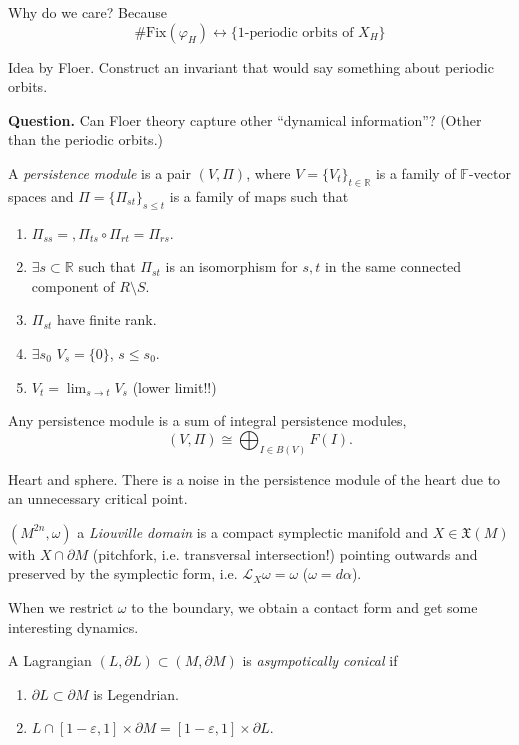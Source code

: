{Why do we care? Because
$$
\# \text{Fix}(\varphi_H)\leftrightarrow\{\text{1-periodic 
orbits of $X_H$}\}
$$

Idea by Floer. Construct an invariant that would 
say something about periodic orbits.

\medskip\noindent
{\bf Question.} Can Floer theory capture other ``dynamical information''? 
(Other than the periodic orbits.)

\medskip\noindent
A {\it persistence module} is a pair $(V,\Pi)$, where $V=\{V_t\}_{t \in
\mathbb{R}}$ is a family of $\mathbb{F}$-vector spaces
and $\Pi=\{\Pi_{st}\}_{s \leq  t}$ is a family of maps such that
\begin{enumerate}
\item $\Pi_{ss}=, \Pi_{ts}\circ \Pi_{rt}=\Pi_{rs}$.
\item $\exists  s \subset \mathbb{R}$ such that
$\Pi_{s t}$ is an isomorphism for $s,t$ in the same connected component of
$R\setminus S$.
\item $\Pi_{s t}$ have finite rank.
\item $\exists s_0$ $V_s=\{0\}$, $s \leq s_0$.
\item $V_t= \lim_{s \to t} V_s$ (lower limit!!)
\end{enumerate}

\begin{theorem}
\label{theorem-persistence-module-is-sum-of-integral}
Any persistence module is a sum of integral persistence modules,
$$
(V,\Pi) \cong \bigoplus_{I \in B(V)}F(I).
$$
\end{theorem}

\begin{example}
\label{example-hart-and-sphere}
Heart and sphere. There is a noise in the persistence module
of the heart due to an unnecessary critical point.
\end{example}

$(M^{2n},\omega)$ a {\it Liouville domain} is a compact
symplectic manifold and $X \in \mathfrak{X}(M)$ 
with $X \cap\partial M$ (pitchfork, i.e. transversal intersection!)
pointing outwards
and preserved by the symplectic form, i.e. $\mathcal{L}_X \omega=\omega$
($\omega=d \alpha$).

When we restrict $\omega$ to the boundary,
we obtain a contact form and get some
interesting dynamics.

A Lagrangian $(L,\partial L) \subset (M,\partial M)$ 
is {\it asympotically conical} if
\begin{enumerate}
\item $\partial L \subset \partial M$ is Legendrian.
\item $L \cap [1-\varepsilon,1] \times \partial M=
[1-\varepsilon,1] \times \partial L$.
\end{enumerate}

}
